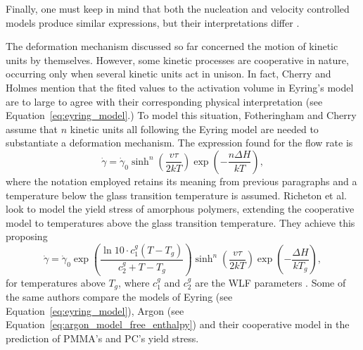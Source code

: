 Finally, one must keep in mind that both the nucleation and velocity controlled models produce similar expressions, but their interpretations differ \citep{fotheringhamRoleRecoveryForces1978}.

The deformation mechanism discussed so far concerned the motion of kinetic units by themselves.
However, some kinetic processes are cooperative in nature, occurring only when several kinetic units act in unison.
In fact, Cherry and Holmes \citep{cherryYieldAdhesiveJoints1969} mention that the fited values to the activation volume in Eyring's model are to large to agree with their corresponding physical interpretation (see Equation~\eqref{eq:eyring_model}.)
To model this situation, Fotheringham and Cherry \citep{fotheringhamCommentCompressionYield1976, fotheringhamRoleRecoveryForces1978} assume that $n$ kinetic units all following the Eyring model are needed to substantiate a deformation mechanism.
The expression found for the flow rate is
\begin{equation}
  \label{eq:cooperative_flow_rule}
	\dot{\gamma}=\dot \gamma_0 \sinh ^n\left(\frac{v \tau}{2 k T}\right) \exp \left(-\frac{n \Delta H}{k T}\right),
\end{equation}
where the notation employed retains its meaning from previous paragraphs and a temperature below the glass transition temperature is assumed.
Richeton et al. \citep{richetonFormulationCooperativeModel2005} look to model the yield stress of amorphous polymers, extending the cooperative model to temperatures above the glass transition temperature.
They achieve this proposing
\begin{equation}
		\dot{\gamma}=\dot \gamma_0 \exp\left(\frac{\ln 10\cdot c_1^g(T - T_g)}{c_2^g + T - T_g}\right) \sinh ^n\left(\frac{v \tau}{2 k T}\right) \exp \left(-\frac{\Delta H}{k T_g}\right),
\end{equation}
for temperatures above $T_g$, where $c_1^g$ and $c_2^g$ are the WLF parameters \citep{wardIntroductionMechanicalProperties2004}.
Some of the same authors \citep{richetonThermodynamicInvestigationYieldstress2007} compare the models of Eyring (see Equation~\eqref{eq:eyring_model}), Argon (see Equation~\eqref{eq:argon_model_free_enthalpy}) and their cooperative model in the prediction of PMMA's and PC's yield stress.

